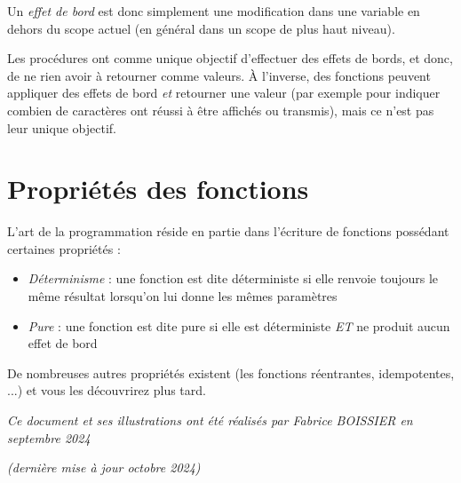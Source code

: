 \documentclass[11pt,a4paper]{article}
\begin{document}
\medskip

Un \textit{effet de bord} est donc simplement une modification dans une variable en dehors du scope actuel (en général dans un scope de plus haut niveau).

\bigskip

Les procédures ont comme unique objectif d'effectuer des effets de bords, et donc, de ne rien avoir à retourner comme valeurs.
\`A l'inverse, des fonctions peuvent appliquer des effets de bord \textit{et} retourner une valeur (par exemple pour indiquer combien de caractères ont réussi à être affichés ou transmis), mais ce n'est pas leur unique objectif.

\bigskip


\section{Propriétés des fonctions}

L'art de la programmation réside en partie dans l'écriture de fonctions possédant certaines propriétés :

\begin{itemize}
\item \textit{Déterminisme} : une fonction est dite déterministe si elle renvoie toujours le même résultat lorsqu'on lui donne les mêmes paramètres

\item \textit{Pure} : une fonction est dite pure si elle est déterministe \textit{ET} ne produit aucun effet de bord
\end{itemize}

De nombreuses autres propriétés existent (les fonctions réentrantes, idempotentes, ...) et vous les découvrirez plus tard.



\bigskip

\vfillFirst

\vfillLast

\begin{center}
\textit{Ce document et ses illustrations ont été réalisés par Fabrice BOISSIER en septembre 2024}

\textit{(dernière mise à jour octobre 2024)}
\end{center}
\end{document}
